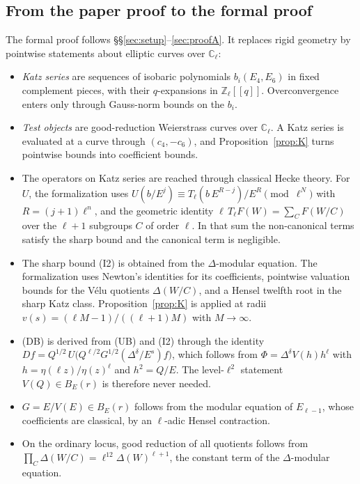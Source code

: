 \documentclass[11pt]{amsart}
\newcommand{\Zl}{\mathbb{Z}_\ell}
\newcommand{\Cl}{\mathbb{C}_\ell}
\theoremstyle{plain}
\theoremstyle{definition}
\numberwithin{equation}{section}
\begin{document}
\subsection{From the paper proof to the formal proof}
The formal proof follows \S\S\ref{sec:setup}--\ref{sec:proofA}. It replaces rigid geometry by pointwise statements about
elliptic curves over $\Cl$:
\begin{itemize}
\item \emph{Katz series} are sequences of isobaric polynomials $b_i(E_4,E_6)$ in fixed complement pieces, with their
  $q$-expansions in $\Zl[[q]]$. Overconvergence enters only through Gauss-norm bounds on the $b_i$.
\item \emph{Test objects} are good-reduction Weierstrass curves over $\Cl$. A Katz series is evaluated at a curve through
  $(c_4,-c_6)$, and Proposition~\ref{prop:K} turns pointwise bounds into coefficient bounds.
\item The operators on Katz series are reached through classical Hecke theory. For $U$, the formalization uses
  $U(b/E^j)\equiv T_\ell(b\,E^{R-j})/E^R\pmod{\ell^N}$ with $R=(j+1)\ell^n$, and the geometric identity
  $\ell\,T_\ell F(W)=\sum_{C}F(W/C)$ over the $\ell+1$ subgroups $C$ of order $\ell$. In that sum the non-canonical terms
  satisfy the sharp bound and the canonical term is negligible.
\item The sharp bound (I2) is obtained from the $\Delta$-modular equation. The formalization uses Newton's identities for
  its coefficients, pointwise valuation bounds for the V\'elu quotients $\Delta(W/C)$, and a Hensel twelfth root in the
  sharp Katz class. Proposition~\ref{prop:K} is applied at radii $v(s)=(\ell M-1)/((\ell+1)M)$ with $M\to\infty$.
\item (DB) is derived from (UB) and (I2) through the identity
  $Df=Q^{1/2}\,U\big(Q^{\ell/2}G^{1/2}(\Delta^\delta/E^s)f\big)$, which follows from $\Phi=\Delta^\delta V(h)h^\ell$ with
  $h=\eta(\ell z)/\eta(z)^\ell$ and $h^2=Q/E$. The level-$\ell^2$ statement $V(Q)\in B_E(r)$ is therefore never needed.
\item $G=E/V(E)\in B_E(r)$ follows from the modular equation of $E_{\ell-1}$, whose coefficients are classical, by an
  $\ell$-adic Hensel contraction.
\item On the ordinary locus, good reduction of all quotients follows from $\prod_C\Delta(W/C)=\ell^{12}\Delta(W)^{\ell+1}$,
  the constant term of the $\Delta$-modular equation.
\end{itemize}
\end{document}
